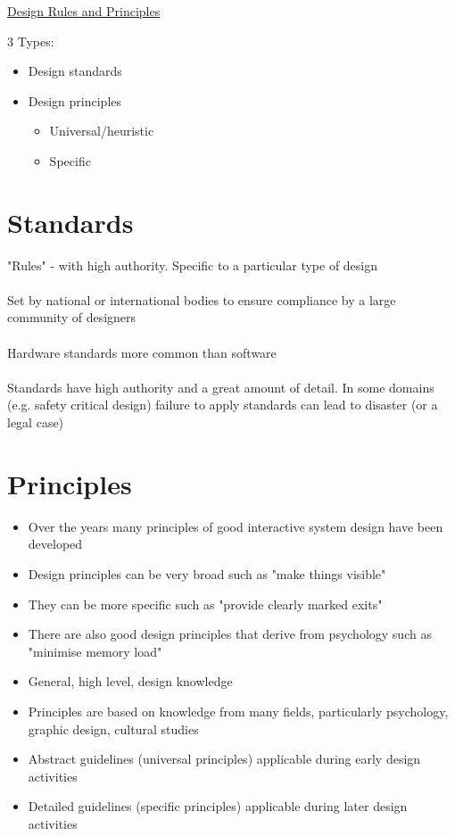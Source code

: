 \documentclass{article}[18pt]
\begin{document}
\begin{center}
\underline{\huge Design Rules and Principles}
\end{center}
3 Types:
\begin{itemize}
	\item Design standards
	\item Design principles
	\begin{itemize}
		\item Universal/heuristic
		\item Specific
	\end{itemize}
\end{itemize}
\section{Standards}
"Rules" - with high authority. Specific to a particular type of design \\
\\
Set by national or international bodies to ensure compliance by a large community of designers\\
\\
Hardware standards more common than software\\
\\
Standards have high authority and a great amount of detail. In some domains (e.g. safety critical design) failure to apply standards can lead to disaster (or a legal case)
\section{Principles}
\begin{itemize}
	\item Over the years many principles of good interactive system design have been developed
	\item Design principles can be very broad such as "make things visible"
	\item They can be more specific such as "provide clearly marked exits"
	\item There are also good design principles that derive from psychology such as "minimise memory load"
	\item General, high level, design knowledge
	\item Principles are based on knowledge from many fields, particularly psychology, graphic design, cultural studies
	\item Abstract guidelines (universal principles) applicable during early design activities
	\item Detailed guidelines (specific principles) applicable during later design activities
\end{itemize}
\end{document}
